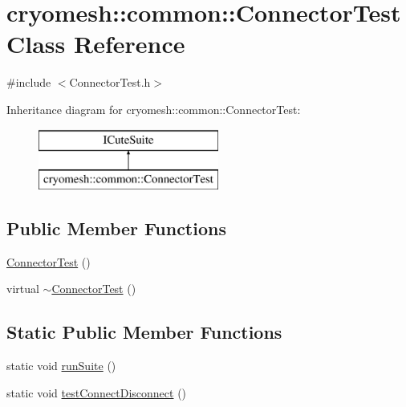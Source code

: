 \hypertarget{classcryomesh_1_1common_1_1_connector_test}{
\section{cryomesh::common::ConnectorTest Class Reference}
\label{classcryomesh_1_1common_1_1_connector_test}
}


{\ttfamily \#include $<$ConnectorTest.h$>$}

Inheritance diagram for cryomesh::common::ConnectorTest:\begin{figure}[H]
\begin{center}
\leavevmode
\includegraphics[height=2.000000cm]{classcryomesh_1_1common_1_1_connector_test}
\end{center}
\end{figure}
\subsection*{Public Member Functions}
\begin{DoxyCompactItemize}
\item 
\hyperlink{classcryomesh_1_1common_1_1_connector_test_a3b7373410094dd3dcb6f9779b4bedb22}{ConnectorTest} ()
\item 
virtual \hyperlink{classcryomesh_1_1common_1_1_connector_test_acf3e82456fe46ad459b986684d3f91f5}{$\sim$ConnectorTest} ()
\end{DoxyCompactItemize}
\subsection*{Static Public Member Functions}
\begin{DoxyCompactItemize}
\item 
static void \hyperlink{classcryomesh_1_1common_1_1_connector_test_a29e3a5baf1934101fa97e27e59f78631}{runSuite} ()
\item 
static void \hyperlink{classcryomesh_1_1common_1_1_connector_test_a710121de59188067a7da827bd98f8a9c}{testConnectDisconnect} ()
\end{DoxyCompactItemize}


